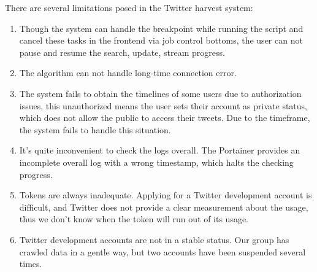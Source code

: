 There are several limitations posed in the Twitter harvest system:\\
\begin{enumerate}
    \item Though the system can handle the breakpoint while running the script and cancel these tasks in the frontend via job control bottoms, the user can not pause and resume the search, update, stream progress.
    \item The algorithm can not handle long-time connection error. 
    \item The system fails to obtain the timelines of some users due to authorization issues, this unauthorized means the user sets their account as private status, which does not allow the public to access their tweets. Due to the timeframe, the system fails to handle this situation.
    \item It’s quite inconvenient to check the logs overall. The Portainer provides an incomplete overall log with a wrong timestamp, which halts the checking progress.
    \item Tokens are always inadequate. Applying for a Twitter development account is difficult, and Twitter does not provide a clear measurement about the usage, thus we don't know when the token will run out of its usage. 
    \item Twitter development accounts are not in a stable status. Our group has crawled data in a gentle way, but two accounts have been suspended several times.
\end{enumerate}
